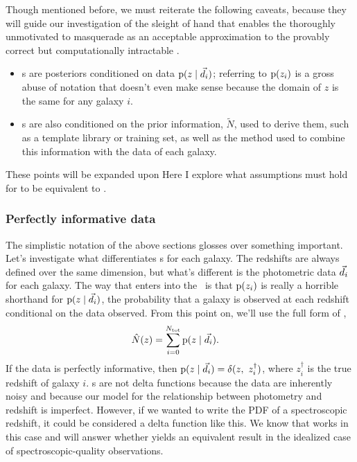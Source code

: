 Though mentioned before, we must reiterate the following caveats, because they will guide our investigation of the sleight of hand that enables the thoroughly unmotivated  to masquerade as an acceptable approximation to the provably correct but computationally intractable .
\begin{itemize}
	\item \Pzpdf s are posteriors conditioned on data $\mathrm{p}(z \mid \vec{d}_{i})$; referring to $\mathrm{p}(z_{i})$ is a gross abuse of notation that doesn't even make sense because the domain of $z$ is the same for any galaxy $i$.
	\item \Pzpdf s are also conditioned on the prior information, $\tilde{N}$, used to derive them, such as a template library or training set, as well as the method used to combine this information with the data of each galaxy.
\end{itemize}
These points will be expanded upon Here I explore what assumptions must hold for  to be equivalent to .

\subsubsection{Perfectly informative data}

The simplistic notation of the above sections glosses over something important.
Let's investigate what differentiates \pzpdf s for each galaxy.
The redshifts are always defined over the same dimension, but what's different is the photometric data $\vec{d}_{i}$ for each galaxy.
The way that enters into the \pzpdf\ is that $\mathrm{p}(z_{i})$ is really a horrible shorthand for $\mathrm{p}(z \mid \vec{d}_{i})$, the probability that a galaxy is observed at each redshift conditional on the data  observed.
From this point on, we'll use the full form of ,
\begin{align}
\eqlabel{eqn:stackwithdata}
\hat{N}(z) &= \sum_{i = 0}^{\ntot} \pr{z \gvn \data_{i}} .
\end{align}
If the data is perfectly informative, then $\pr{z \gvn \data_{i}} = \delta(z,\ z_{i}^{\dagger})$, where $z_{i}^{\dagger}$ is the true redshift of galaxy $i$.
\Pzpdf s are not delta functions because the data are inherently noisy and because our model for the relationship between photometry and redshift is imperfect.
However, if we wanted to write the PDF of a spectroscopic redshift, it could be considered a delta function like this.
We know that  works in this case and will answer whether  yields an equivalent result in the idealized case of spectroscopic-quality observations.

